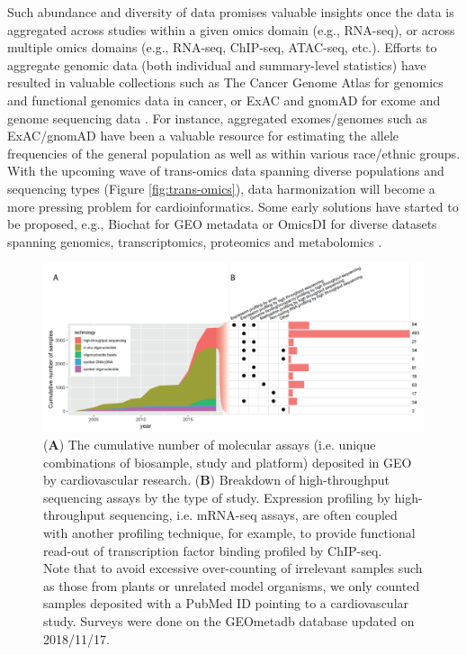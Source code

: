 \documentclass[letter]{bioinfo}
\begin{document}
	Such abundance and diversity of data promises valuable insights once the data is aggregated across studies within a given omics domain (e.g., RNA-seq), or across multiple omics domains (e.g., RNA-seq, ChIP-seq, ATAC-seq, etc.). Efforts to aggregate genomic data (both individual and summary-level statistics) have resulted in valuable collections such as The Cancer Genome Atlas \citep{TCGA:2013:Cancer} for genomics and functional genomics data in cancer, or ExAC and gnomAD for exome and genome sequencing data \citep{Lek:2016:Analysis}. For instance, aggregated exomes/genomes such as ExAC/gnomAD have been a valuable resource for estimating the allele frequencies of the general population as well as within various race/ethnic groups. With the upcoming wave of trans-omics data spanning diverse populations and sequencing types (Figure \ref{fig:trans-omics}), data harmonization will become a more pressing problem for cardioinformatics. Some early solutions have started to be proposed, e.g., Biochat for GEO metadata \citep{Khomtchouk:2018:Biochat} or OmicsDI for diverse datasets spanning genomics, transcriptomics, proteomics and metabolomics \citep{Perez-Riverol:2017:Discovering}.
	
	\begin{figure}[!tpb]
		\includegraphics[width=1\linewidth]{assay-count-cardio}
		\caption{(\textbf{A}) The cumulative number of molecular assays (i.e. unique combinations of biosample, study and platform) deposited in GEO by cardiovascular research. (\textbf{B}) Breakdown of high-throughput sequencing assays by the type of study. Expression profiling by high-throughput sequencing, i.e. mRNA-seq assays, are often coupled with another profiling technique, for example, to provide functional read-out of transcription factor binding profiled by ChIP-seq. \label{fig:geo-assay}\\ Note that to avoid excessive over-counting of irrelevant samples such as those from plants or unrelated model organisms, we only counted samples deposited with a PubMed ID pointing to a cardiovascular study. Surveys were done on the GEOmetadb database \citep{Zhu:2008:GEOmetadb} updated on 2018/11/17.}
	\end{figure} 
	
\end{document}
